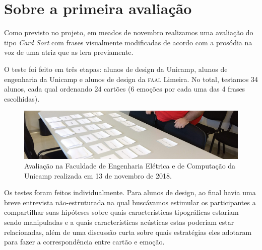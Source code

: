\documentclass[a4paper,11pt,titlepage,singlespacing]{article}
\begin{document}
{\color{pos_parecer}

    \newpage


    \section{Sobre a primeira avaliação}
    \label{sec:n_avaliacao_1}

    Como previsto no projeto, em meados de novembro realizamos uma avaliação do tipo \textit{Card Sort} com frases visualmente modificadas de acordo com a prosódia na voz de uma atriz que as lera previamente. 
    
    O teste foi feito em três etapas: alunos de design da Unicamp, alunos de engenharia da Unicamp e alunos de design da \textsc{faal} Limeira. No total, testamos 34 alunos, cada qual ordenando 24 cartões (6 emoções por cada uma das 4 frases escolhidas).
    
    
    \begin{figure}[!ht]    
        \centering
        \label{fig:card_sort}
        \captionsetup{width=\textwidth}
            \includegraphics[width=1\textwidth]{fig/card_sort.jpg}
            
        \caption{Avaliação na Faculdade de Engenharia Elétrica e de Computação da Unicamp realizada em 13 de novembro de 2018.}
    \end{figure}
    

    
    Os testes foram feitos individualmente. Para alunos de design, ao final havia uma breve entrevista não-estruturada na qual buscávamos estimular os participantes a compartilhar suas hipóteses sobre quais características tipográficas estariam sendo manipuladas e a quais características acústicas estas poderiam estar relacionadas, além de uma discussão curta sobre quais estratégias eles adotaram para fazer a correspondência entre cartão e emoção.
    
}
\end{document}
